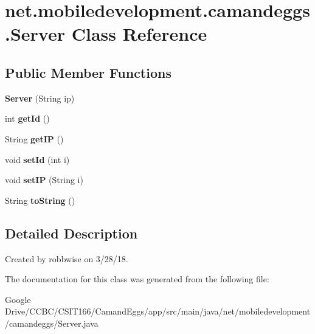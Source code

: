 \hypertarget{classnet_1_1mobiledevelopment_1_1camandeggs_1_1_server}{}\section{net.\+mobiledevelopment.\+camandeggs.\+Server Class Reference}
\label{classnet_1_1mobiledevelopment_1_1camandeggs_1_1_server}
\subsection*{Public Member Functions}
\begin{DoxyCompactItemize}
\item 
\mbox{\label{classnet_1_1mobiledevelopment_1_1camandeggs_1_1_server_a773bd30a67a11c01639d96bf5205a762}} 
{\bfseries Server} (String ip)
\item 
\mbox{\label{classnet_1_1mobiledevelopment_1_1camandeggs_1_1_server_a2c9a1872e2e6ff97b8f4ac9cb34d71f5}} 
int {\bfseries get\+Id} ()
\item 
\mbox{\label{classnet_1_1mobiledevelopment_1_1camandeggs_1_1_server_ac4fc0647dde28db00e875573530b860c}} 
String {\bfseries get\+IP} ()
\item 
\mbox{\label{classnet_1_1mobiledevelopment_1_1camandeggs_1_1_server_a1be30996fde32971d7414df0adf7df1b}} 
void {\bfseries set\+Id} (int i)
\item 
\mbox{\label{classnet_1_1mobiledevelopment_1_1camandeggs_1_1_server_a54a629226e0ed116a93405107d91b8b3}} 
void {\bfseries set\+IP} (String i)
\item 
\mbox{\label{classnet_1_1mobiledevelopment_1_1camandeggs_1_1_server_aa2e205a94f8c7ae112cc50c308cd0000}} 
String {\bfseries to\+String} ()
\end{DoxyCompactItemize}


\subsection{Detailed Description}
Created by robbwise on 3/28/18. 

The documentation for this class was generated from the following file\+:\begin{DoxyCompactItemize}
\item 
Google Drive/\+C\+C\+B\+C/\+C\+S\+I\+T166/\+Camand\+Eggs/app/src/main/java/net/mobiledevelopment/camandeggs/Server.\+java\end{DoxyCompactItemize}
